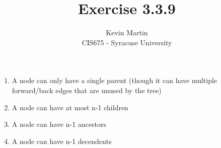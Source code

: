 \documentclass{article}
\author{Kevin Martin\\ CIS675 - Syracuse University}
\title{Exercise 3.3.9}
\begin{document}
\maketitle
\begin{enumerate}
  \item A node can only have a single parent (though it can have multiple
    forward/back edges that are unused by the tree)
  \item A node can have at most n-1 children
  \item A node can have n-1 ancestors
  \item A node can have n-1 decendents
  \end{enumerate}
\end{document}
